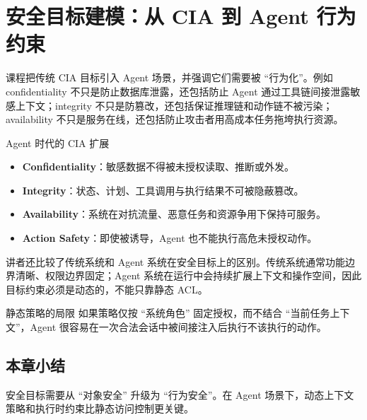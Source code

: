 \section{安全目标建模：从 CIA 到 Agent 行为约束}

课程把传统 CIA 目标引入 Agent 场景，并强调它们需要被 ``行为化''。例如 confidentiality 不只是防止数据库泄露，还包括防止 Agent 通过工具链间接泄露敏感上下文；integrity 不只是防篡改，还包括保证推理链和动作链不被污染；availability 不只是服务在线，还包括防止攻击者用高成本任务拖垮执行资源。

\begin{importantbox}{Agent 时代的 CIA 扩展}
\begin{itemize}
    \item \textbf{Confidentiality}：敏感数据不得被未授权读取、推断或外发。
    \item \textbf{Integrity}：状态、计划、工具调用与执行结果不可被隐蔽篡改。
    \item \textbf{Availability}：系统在对抗流量、恶意任务和资源争用下保持可服务。
    \item \textbf{Action Safety}：即使被诱导，Agent 也不能执行高危未授权动作。
\end{itemize}
\end{importantbox}

讲者还比较了传统系统和 Agent 系统在安全目标上的区别。传统系统通常功能边界清晰、权限边界固定；Agent 系统在运行中会持续扩展上下文和操作空间，因此目标约束必须是动态的，不能只靠静态 ACL。

\begin{warningbox}{静态策略的局限}
如果策略仅按 ``系统角色'' 固定授权，而不结合 ``当前任务上下文''，Agent 很容易在一次合法会话中被间接注入后执行不该执行的动作。
\end{warningbox}

\subsection{本章小结}
安全目标需要从 ``对象安全'' 升级为 ``行为安全''。在 Agent 场景下，动态上下文策略和执行时约束比静态访问控制更关键。

